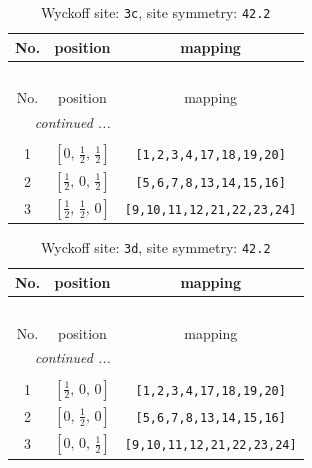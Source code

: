 \documentclass[fleqn,8pt]{jsarticle}
\begin{document}
\begin{longtable}{ccc}
\caption{Wyckoff site: {\tt 3c}, site symmetry: {\tt 42.2}}
 \\
 \hline \hline
No. & position & mapping \\ \hline \endfirsthead

\multicolumn{2}{l}{\tablename\ \thetable{}} \\
 \hline \hline
No. & position & mapping \\ \hline \endhead

 \hline \hline
\multicolumn{2}{r}{\footnotesize\it continued ...} \\ \endfoot

 \hline \hline
\multicolumn{2}{r}{} \\ \endlastfoot

1 & $\left[ 0,\, \frac{1}{2},\, \frac{1}{2} \right]$ & {\tt [1,2,3,4,17,18,19,20]} \\ \hline
2 & $\left[ \frac{1}{2},\, 0,\, \frac{1}{2} \right]$ & {\tt [5,6,7,8,13,14,15,16]} \\ \hline
3 & $\left[ \frac{1}{2},\, \frac{1}{2},\, 0 \right]$ & {\tt [9,10,11,12,21,22,23,24]} \\
\end{longtable}
\renewcommand{\arraystretch}{1.2}
\begin{longtable}{ccc}
\caption{Wyckoff site: {\tt 3d}, site symmetry: {\tt 42.2}}
 \\
 \hline \hline
No. & position & mapping \\ \hline \endfirsthead

\multicolumn{2}{l}{\tablename\ \thetable{}} \\
 \hline \hline
No. & position & mapping \\ \hline \endhead

 \hline \hline
\multicolumn{2}{r}{\footnotesize\it continued ...} \\ \endfoot

 \hline \hline
\multicolumn{2}{r}{} \\ \endlastfoot

1 & $\left[ \frac{1}{2},\, 0,\, 0 \right]$ & {\tt [1,2,3,4,17,18,19,20]} \\ \hline
2 & $\left[ 0,\, \frac{1}{2},\, 0 \right]$ & {\tt [5,6,7,8,13,14,15,16]} \\ \hline
3 & $\left[ 0,\, 0,\, \frac{1}{2} \right]$ & {\tt [9,10,11,12,21,22,23,24]} \\
\end{longtable}
\renewcommand{\arraystretch}{1.2}
\end{document}
